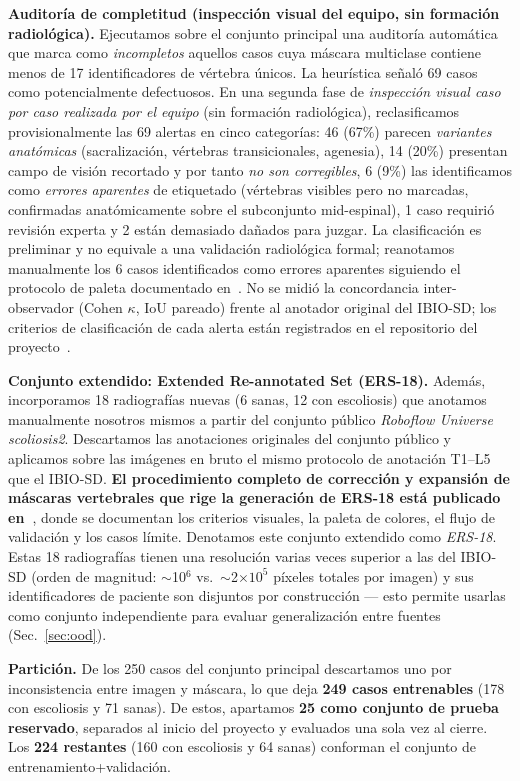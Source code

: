 \documentclass[conference]{IEEEtran}
\begin{document}
\textbf{Auditoría de completitud (inspección visual del equipo, sin formación radiológica).} Ejecutamos sobre el conjunto principal una auditoría automática que marca como \emph{incompletos} aquellos casos cuya máscara multiclase contiene menos de 17 identificadores de vértebra únicos. La heurística señaló 69 casos como potencialmente defectuosos. En una segunda fase de \emph{inspección visual caso por caso realizada por el equipo} (sin formación radiológica), reclasificamos provisionalmente las 69 alertas en cinco categorías: 46 (67\%) parecen \emph{variantes anatómicas} (sacralización, vértebras transicionales, agenesia), 14 (20\%) presentan campo de visión recortado y por tanto \emph{no son corregibles}, 6 (9\%) las identificamos como \emph{errores aparentes} de etiquetado (vértebras visibles pero no marcadas, confirmadas anatómicamente sobre el subconjunto mid-espinal), 1 caso requirió revisión experta y 2 están demasiado dañados para juzgar. La clasificación es preliminar y no equivale a una validación radiológica formal; reanotamos manualmente los 6 casos identificados como errores aparentes siguiendo el protocolo de paleta documentado en~\cite{ers18_protocol}. No se midió la concordancia inter-observador (Cohen $\kappa$, IoU pareado) frente al anotador original del IBIO-SD; los criterios de clasificación de cada alerta están registrados en el repositorio del proyecto~\cite{project_repo}.

\textbf{Conjunto extendido: Extended Re-annotated Set (ERS-18).} Además, incorporamos 18 radiografías nuevas (6 sanas, 12 con escoliosis) que anotamos manualmente nosotros mismos a partir del conjunto público \emph{Roboflow Universe scoliosis2}. Descartamos las anotaciones originales del conjunto público y aplicamos sobre las imágenes en bruto el mismo protocolo de anotación T1--L5 que el IBIO-SD. \textbf{El procedimiento completo de corrección y expansión de máscaras vertebrales que rige la generación de ERS-18 está publicado en~\cite{ers18_protocol}}, donde se documentan los criterios visuales, la paleta de colores, el flujo de validación y los casos límite. Denotamos este conjunto extendido como \emph{ERS-18}. Estas 18 radiografías tienen una resolución varias veces superior a las del IBIO-SD (orden de magnitud: $\sim$10$^6$ vs.\ $\sim$2$\times 10^5$ píxeles totales por imagen) y sus identificadores de paciente son disjuntos por construcción --- esto permite usarlas como conjunto independiente para evaluar generalización entre fuentes (Sec.~\ref{sec:ood}).

\textbf{Partición.} De los 250 casos del conjunto principal descartamos uno por inconsistencia entre imagen y máscara, lo que deja \textbf{249 casos entrenables} (178 con escoliosis y 71 sanas). De estos, apartamos \textbf{25 como conjunto de prueba reservado}, separados al inicio del proyecto y evaluados una sola vez al cierre. Los \textbf{224 restantes} (160 con escoliosis y 64 sanas) conforman el conjunto de entrenamiento+validación.
\end{document}
